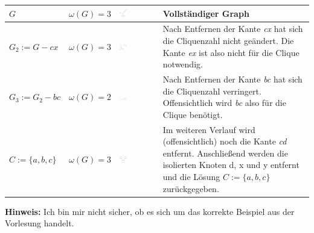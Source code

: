 \documentclass{article} %
\begin{document}
\begin{table}[!htp]
\centering
\begin{tabular}{|l|l|l|p{8cm}|}
\hline
$G$ &  $\omega (G) = 3$ & \includegraphics[width=0.2\textwidth,trim=0 0 0 -5]{img/clique1.png} &   Vollständiger Graph \\ \hline
$G_2 := G - cx$ &  $\omega (G) = 3$ & \includegraphics[width=0.2\textwidth,trim=0 0 0 -5]{img/clique2.png} & Nach Entfernen der Kante \emph{cx} hat sich die Cliquenzahl nicht geändert.
Die Kante \emph{ex} ist also nicht für die Clique notwendig. \\ \hline
$G_3 := G_2 - bc $  & $\omega (G) = 2$  & \includegraphics[width=0.2\textwidth,trim=0 0 0 -5]{img/clique4.png} & Nach Entfernen der Kante \emph{bc} hat sich die Cliquenzahl verringert.
 Offensichtlich wird \emph{bc} also für die Clique benötigt. \\ \hline
$C := \{a,b,c\} $  & $\omega (G) = 3$  & \includegraphics[width=0.2\textwidth,trim=0 0 0 -5]{img/clique3.png} & Im weiteren Verlauf wird (offensichtlich) noch die Kante \emph{cd} entfernt. Anschließend werden die isolierten Knoten d, x und y entfernt und die Lösung $C := \{a,b,c\}$ zurückgegeben.\\ \hline
\end{tabular}
\end{table}

\textbf{Hinweis:} Ich bin mir nicht sicher, ob es sich um das korrekte Beispiel aus der Vorlesung handelt.\\
\end{document}
